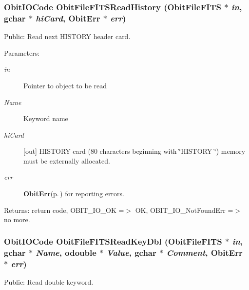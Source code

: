\subsubsection{\setlength{\rightskip}{0pt plus 5cm}Obit\-IOCode Obit\-File\-FITSRead\-History ({\bf Obit\-File\-FITS} $\ast$ {\em in}, gchar $\ast$ {\em hi\-Card}, {\bf Obit\-Err} $\ast$ {\em err})}\label{ObitFileFITS_8h_a18}


Public: Read next HISTORY header card. 

\begin{Desc}
\item[Parameters:]
\begin{description}
\item[{\em in}]Pointer to object to be read \item[{\em Name}]Keyword name \item[{\em hi\-Card}][out] HISTORY card (80 characters beginning with \char`\"{}HISTORY \char`\"{}) memory must be externally allocated. \item[{\em err}]{\bf Obit\-Err}{\rm (p.\,\pageref{structObitErr})} for reporting errors. \end{description}
\end{Desc}
\begin{Desc}
\item[Returns:]return code, OBIT\_\-IO\_\-OK =$>$ OK, OBIT\_\-IO\_\-Not\-Found\-Err =$>$ no more. \end{Desc}
\subsubsection{\setlength{\rightskip}{0pt plus 5cm}Obit\-IOCode Obit\-File\-FITSRead\-Key\-Dbl ({\bf Obit\-File\-FITS} $\ast$ {\em in}, gchar $\ast$ {\em Name}, {\bf odouble} $\ast$ {\em Value}, gchar $\ast$ {\em Comment}, {\bf Obit\-Err} $\ast$ {\em err})}\label{ObitFileFITS_8h_a16}


Public: Read double keyword. 

